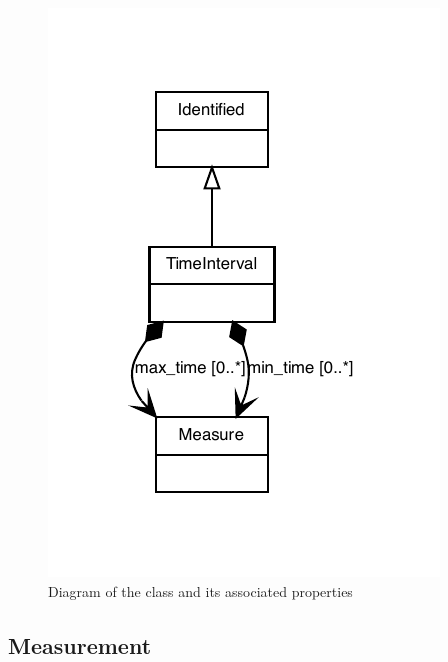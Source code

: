 \begin{figure}[ht]
\begin{center}
\includegraphics[scale=0.8]{figures/TimeInterval}
\caption[]{Diagram of the  class and its associated properties}
\label{uml:TimeInterval}
\end{center}
\end{figure}


\subsection{Measurement}
\label{sec:Measurement}

